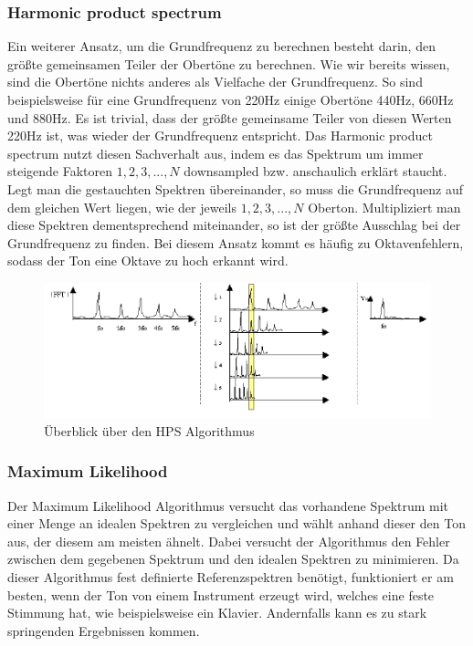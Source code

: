 \subsubsection*{Harmonic product spectrum}
Ein weiterer Ansatz, um die Grundfrequenz zu berechnen besteht darin, den größte gemeinsamen Teiler der Obertöne zu berechnen. Wie wir bereits wissen, sind die Obertöne nichts anderes als Vielfache der Grundfrequenz. So sind beispielsweise für eine Grundfrequenz von 220Hz einige Obertöne 440Hz, 660Hz und 880Hz. Es ist trivial, dass der größte gemeinsame Teiler von diesen Werten 220Hz ist, was wieder der Grundfrequenz entspricht. Das Harmonic product spectrum nutzt diesen Sachverhalt aus, indem es das Spektrum um immer steigende Faktoren $1,2,3,...,N$ downsampled bzw. anschaulich erklärt staucht. Legt man die gestauchten Spektren übereinander, so muss die Grundfrequenz auf dem gleichen Wert liegen, wie der jeweils $1,2,3,...,N$ Oberton. Multipliziert man diese Spektren dementsprechend miteinander, so ist der größte Ausschlag bei der Grundfrequenz zu finden. Bei diesem Ansatz kommt es häufig zu Oktavenfehlern, sodass der Ton eine Oktave zu hoch erkannt wird. \cite{cuadra2001hps}
\begin{figure}[H]
    \centering
    \includegraphics[width=1\textwidth]{Bilder/hps_algo.png}
    \caption{Überblick über den HPS Algorithmus \cite{cuadra2001hps}}
    \label{sec:hps_algo}
\end{figure}

\subsubsection*{Maximum Likelihood}
Der Maximum Likelihood Algorithmus versucht das vorhandene Spektrum mit einer Menge an idealen Spektren zu vergleichen und wählt anhand dieser den Ton aus, der diesem am meisten ähnelt. Dabei versucht der Algorithmus den Fehler zwischen dem gegebenen Spektrum und den idealen Spektren zu minimieren. Da dieser Algorithmus fest definierte Referenzspektren benötigt, funktioniert er am besten, wenn der Ton von einem Instrument erzeugt wird, welches eine feste Stimmung hat, wie beispielsweise ein Klavier. Andernfalls kann es zu stark springenden Ergebnissen kommen. \cite{cuadra2001hps}

